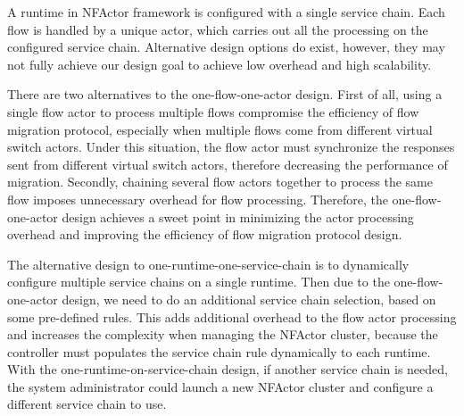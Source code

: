 A runtime in NFActor framework is configured with a single service chain. Each flow is handled by a unique actor, which carries out all the processing on the configured service chain. Alternative design options do exist, however, they may not fully achieve our design goal to achieve low overhead and high scalability.

There are two alternatives to the one-flow-one-actor design. First of all, using a single flow actor to process multiple flows compromise the efficiency of flow migration protocol, especially when multiple flows come from different virtual switch actors. Under this situation, the flow actor must synchronize the responses sent from different virtual switch actors, therefore decreasing the performance of migration. Secondly, chaining several flow actors together to process the same flow imposes unnecessary overhead for flow processing. Therefore, the one-flow-one-actor design achieves a sweet point in minimizing the actor processing overhead and improving the efficiency of flow migration protocol design.

The alternative design to one-runtime-one-service-chain is to dynamically configure multiple service chains on a single runtime. Then due to the one-flow-one-actor design, we need to do an additional service chain selection, based on some pre-defined rules. This adds additional overhead to the flow actor processing and increases the complexity when managing the NFActor cluster, because the controller must populates the service chain rule dynamically to each runtime. With the one-runtime-on-service-chain design, if another service chain is needed, the system administrator could launch a new NFActor cluster and configure a different service chain to use.
